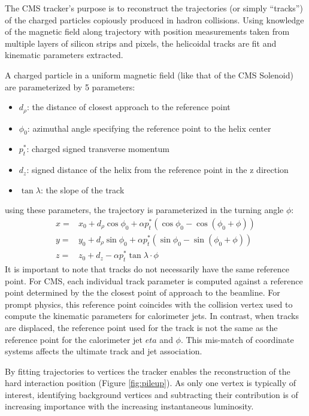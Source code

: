 {The CMS tracker's purpose is to reconstruct the trajectories (or simply ``tracks'') of the charged particles
 copiously produced in hadron collisions. Using knowledge of the magnetic field along trajectory
 with position measurements taken from multiple layers of silicon strips and pixels, the helicoidal tracks are
 fit and kinematic parameters extracted.  

A charged particle in a uniform magnetic field (like that of the CMS Solenoid) 
are parameterized by 5 parameters:
\begin{itemize}
\item $d_{\rho}$: the distance of closest approach to the reference point
\item $\phi_0$: azimuthal angle specifying the reference point to the helix center 
\item  $p_t^*$: charged signed transverse momentum
\item  $d_z$: signed distance of the helix from the reference point in the z direction
\item $\tan \lambda$: the slope of the track 
\end{itemize}
using these parameters, the trajectory is parameterized in the turning angle $\phi$:
\begin{align*}
x =& x_0 + d_\rho \cos \phi_0 + \alpha p_{t}^* ( \cos \phi_0 - \cos(\phi_0 + \phi) ) \\
y =& y_0 + d_\rho \sin \phi_0 + \alpha p_{t}^* ( \sin \phi_0 - \sin(\phi_0 + \phi) ) \\
z =& z_0 + d_z - \alpha p_{t}^*  \tan \lambda \cdot \phi 
\end{align*}
It is important to note that tracks do not necessarily  have the same reference point. For CMS, each
individual track parameter is computed against a reference point determined by the the closest
point of approach to the beamline. For prompt physics, this reference point coincides with the
collision vertex used to compute the kinematic parameters for calorimeter jets. In contrast, when
tracks are displaced, the reference point used for the track is not the same as the reference point
for the calorimeter jet $eta$ and $\phi$. This mis-match of coordinate systems affects the ultimate
track and jet association. 

By fitting trajectories to vertices the tracker enables the reconstruction 
of the hard interaction position (Figure \ref{fig:pileup}). As only one vertex is typically
of interest, identifying background vertices and subtracting their contribution is of increasing
importance with the increasing instantaneous luminosity. 

}
